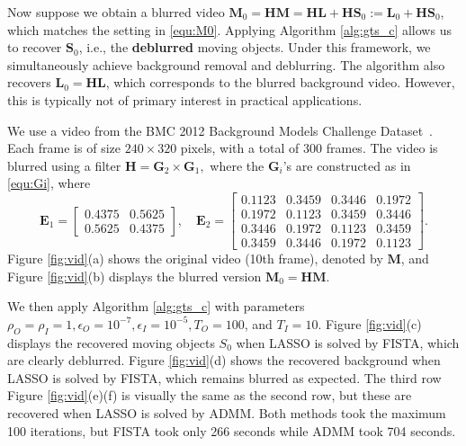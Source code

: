 \documentclass[10pt]{article}  	%
\theoremstyle{definition}
\theoremstyle{definition}
\newcommand{\mE}{\mathbf{E}}
\newcommand{\mG}{\mathbf{G}}
\newcommand{\mH}{\mathbf{H}}
\newcommand{\mL}{\mathbf{L}}
\newcommand{\mM}{\mathbf{M}}
\newcommand{\mS}{\mathbf{S}}
\theoremstyle{remark}
\begin{document}
Now suppose we obtain a blurred video $\mM_0 = \mH\mM=\mH\mL+\mH\mS_0:=\mL_0+\mH\mS_0$, which matches the setting in \eqref{equ:M0}. Applying Algorithm \ref{alg:gts_c} allows us to recover $\mS_0$, i.e., the \textbf{deblurred} moving objects. Under this framework, we simultaneously achieve background removal and deblurring. The algorithm also recovers $\mL_0=\mH\mL$, which corresponds to the blurred background video. However, this is typically not of primary interest in practical applications.

We use a video from the  BMC 2012 Background Models Challenge Dataset~\cite{vacavant2012benchmark}. Each frame is of size $240\times 320$ pixels, with a total of 300 frames. The video is blurred using a filter $\mH=\mG_2\times \mG_1,$ where the $\mG_i$'s are constructed as in \eqref{equ:Gi}, where
$$\mE_1= \begin{bmatrix}
0.4375&0.5625\\ 0.5625   & 0.4375
\end{bmatrix}, \quad 
\mE_2=
\begin{bmatrix}
 0.1123   & 0.3459   & 0.3446  &  0.1972\\
    0.1972  &  0.1123  &  0.3459 &   0.3446\\
    0.3446  &  0.1972  &  0.1123  &  0.3459\\
    0.3459  &  0.3446   & 0.1972 &   0.1123
    \end{bmatrix}.
    $$
Figure \ref{fig:vid}(a) shows the original video (10th frame), denoted by $\mM$, and Figure \ref{fig:vid}(b) displays the blurred version $\mM_0=\mH\mM$.

We then apply Algorithm \ref{alg:gts_c} with parameters $\rho_O=\rho_I=1, \epsilon_O = 10^{-7}, \epsilon_I=10^{-5}, T_O=100$, and $T_I = 10$. Figure \ref{fig:vid}(c) displays the recovered moving objects $S_0$ when LASSO is solved by FISTA, which are clearly deblurred. Figure \ref{fig:vid}(d) shows the recovered background when LASSO is solved by FISTA, which remains blurred as expected. The third row Figure \ref{fig:vid}(e)(f) is visually the same as the second row, but these are recovered when LASSO is solved by ADMM. Both methods took the maximum 100 iterations, but FISTA took only 266 seconds while ADMM took 704 seconds.
\end{document}

